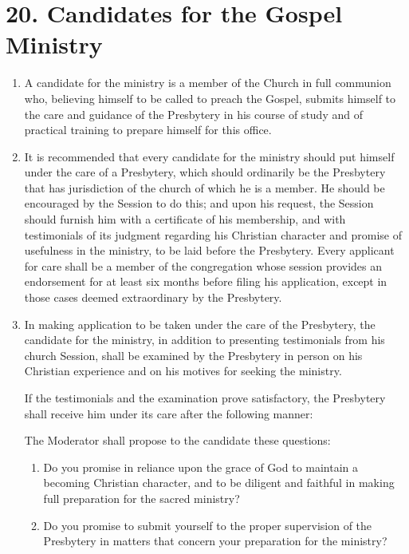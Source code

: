 \documentclass[
]{book}
\begin{document}
\hypertarget{candidates-for-the-gospel-ministry}{%
\section*{20. Candidates for the Gospel Ministry}\label{candidates-for-the-gospel-ministry}}

\protect\hypertarget{chapter-slug-20-candidates-for-the-gospel-ministry}{\href{}{}}

\begin{enumerate}
\def\labelenumi{\arabic{enumi}.}
\item
  \protect\hypertarget{20}{\href{}{}}A candidate for the ministry is a member of the Church in full communion who, believing himself to be called to preach the Gospel, submits himself to the care and guidance of the Presbytery in his course of study and of practical training to prepare himself for this office.
\item
  \protect\hypertarget{20.2}{\href{}{}}It is recommended that every candidate for the ministry should put himself under the care of a Presbytery, which should ordinarily be the Presbytery that has jurisdiction of the church of which he is a member. He should be encouraged by the Session to do this; and upon his request, the Session should furnish him with a certificate of his membership, and with testimonials of its judgment regarding his Christian character and promise of usefulness in the ministry, to be laid before the Presbytery. Every applicant for care shall be a member of the congregation whose session provides an endorsement for at least six months before filing his application, except in those cases deemed extraordinary by the Presbytery.
\item
  In making application to be taken under the care of the Presbytery, the candidate for the ministry, in addition to presenting testimonials from his church Session, shall be examined by the Presbytery in person on his Christian experience and on his motives for seeking the ministry.

  If the testimonials and the examination prove satisfactory, the Presbytery shall receive him under its care after the following manner:

  The Moderator shall propose to the candidate these questions:

  \begin{enumerate}
  \def\labelenumii{\alph{enumii}.}
  \item
    Do you promise in reliance upon the grace of God to maintain a becoming Christian character, and to be diligent and faithful in making full preparation for the sacred ministry?
  \item
    Do you promise to submit yourself to the proper supervision of the Presbytery in matters that concern your preparation for the ministry?
  \end{enumerate}


\end{enumerate}
\end{document}
